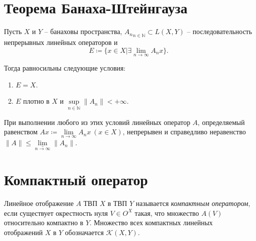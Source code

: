 \section{Теорема Банаха-Штейнгауза}

\begin{theorem}
	Пусть $X$ и $Y$ -- банаховы пространства, ${A_n}_{n\in \mathbb{N}} \subset L(X,Y)$ -- последовательность непрерывных линейных операторов и
	\[
		E \coloneq \{x \in X | \exists \underset{n \rightarrow \infty }{\lim} A_n x\}.
	\]

	Тогда равносильны следующие условия:
	\begin{enumerate}
		\item $E = X$.
		\item $E$ плотно в $X$ и $\underset{n \in \mathbb{N}}{\sup} \|A_n\| < +\infty $.
	\end{enumerate}

	При выполнении любого из этих условий линейных оператор $A$, определяемый равенством $Ax \coloneq \underset{n \rightarrow \infty }{\lim} A_n x \ (x \in X)$, непрерывен и справедливо неравенство $\|A\| \leqslant \underset{n \rightarrow \infty }{\underline{\lim} } \|A_n\|$.
\end{theorem}

\section{Компактный оператор}

\begin{definition}
	Линейное отображение $A$ ТВП $X$ в ТВП $Y$ называется \emph{компактным оператором}, если существует окрестность нуля $V \in O^X$ такая, что множество $A(V)$ относительно компактно в $Y$. Множество всех компактных линейных отображений $X$ в $Y$ обозначается $\mathscr{K}(X,Y)$.
\end{definition}
